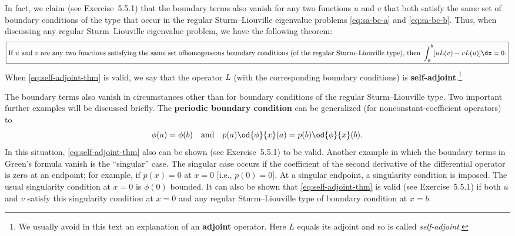 In fact, we claim (see Exercise~5.5.1) that the boundary terms also vanish for any two functions $u$ and $v$ that both satisfy the same set of boundary conditions of the type that occur in the regular Sturm--Liouville eigenvalue problems \eqref{eq:sa-bc-a} and \eqref{eq:sa-bc-b}.  Thus, when discussing any regular Sturm--Liouville eigenvalue problem, we have the following theorem:
\begin{equation}
\label{eq:self-adjoint-thm}
\boxed{\text{If } u \text{ and } v \text{ are any two functions satisfying the same set of} \\
\text{homogeneous boundary conditions (of the regular Sturm--} \\
\text{Liouville type), then } \int_a^b [uL(v) - vL(u)]\dx = 0.}
\end{equation}
When \eqref{eq:self-adjoint-thm} is valid, we say that the operator $L$ (with the corresponding boundary conditions) is \textbf{self-adjoint}.\footnote{We usually avoid in this text an explanation of an \textbf{adjoint} operator.  Here $L$ equals its adjoint and so is called \textit{self-adjoint}.}

The boundary terms also vanish in circumstances other than for boundary conditions of the regular Sturm--Liouville type.  Two important further examples will be discussed briefly.  The \textbf{periodic boundary condition} can be generalized (for nonconstant-coefficient operators) to
\[
\phi(a) = \phi(b) \quad \text{and} \quad p(a)\od{\phi}{x}(a) = p(b)\od{\phi}{x}(b).
\]
In this situation, \eqref{eq:self-adjoint-thm} also can be shown (see Exercise~5.5.1) to be valid.  Another example in which the boundary terms in Green's formula vanish is the ``singular'' case.  The singular case occurs if the coefficient of the second derivative of the differential operator is zero at an endpoint; for example, if $p(x) = 0$ at $x = 0$ [i.e., $p(0) = 0$].  At a singular endpoint, a singularity condition is imposed.  The usual singularity condition at $x = 0$ is $\phi(0)$ bounded.  It can also be shown that \eqref{eq:self-adjoint-thm} is valid (see Exercise~5.5.1) if both $u$ and $v$ satisfy this singularity condition at $x = 0$ and any regular Sturm--Liouville type of boundary condition at $x = b$.

